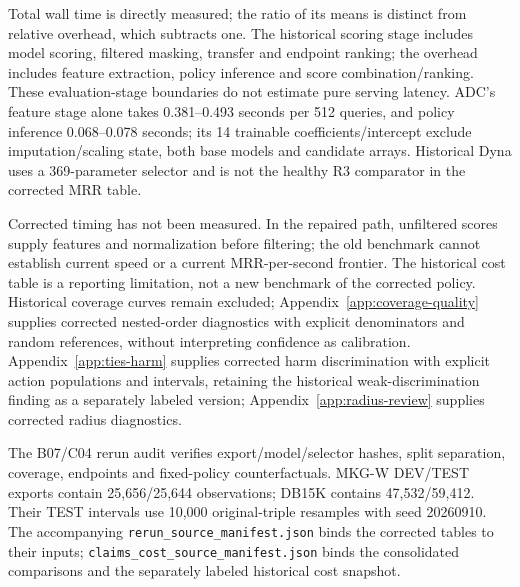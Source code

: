 \documentclass[11pt,a4paper]{article}
\begin{document}
Total wall time is directly measured; the ratio of its means is distinct from relative overhead, which subtracts one. The historical scoring stage includes model scoring, filtered masking, transfer and endpoint ranking; the overhead includes feature extraction, policy inference and score combination/ranking. These evaluation-stage boundaries do not estimate pure serving latency. ADC's feature stage alone takes 0.381--0.493 seconds per 512 queries, and policy inference 0.068--0.078 seconds; its 14 trainable coefficients/intercept exclude imputation/scaling state, both base models and candidate arrays. Historical Dyna uses a 369-parameter selector and is not the healthy R3 comparator in the corrected MRR table.

Corrected timing has not been measured. In the repaired path, unfiltered scores supply features and normalization before filtering; the old benchmark cannot establish current speed or a current MRR-per-second frontier. The historical cost table is a reporting limitation, not a new benchmark of the corrected policy. Historical coverage curves remain excluded; Appendix~\ref{app:coverage-quality} supplies corrected nested-order diagnostics with explicit denominators and random references, without interpreting confidence as calibration. Appendix~\ref{app:ties-harm} supplies corrected harm discrimination with explicit action populations and intervals, retaining the historical weak-discrimination finding as a separately labeled version; Appendix~\ref{app:radius-review} supplies corrected radius diagnostics.

The B07/C04 rerun audit verifies export/model/selector hashes, split separation, coverage, endpoints and fixed-policy counterfactuals. MKG-W DEV/TEST exports contain 25,656/25,644 observations; DB15K contains 47,532/59,412. Their TEST intervals use 10,000 original-triple resamples with seed 20260910. The accompanying \texttt{rerun\_source\_manifest.json} binds the corrected tables to their inputs; \texttt{claims\_cost\_source\_manifest.json} binds the consolidated comparisons and the separately labeled historical cost snapshot.

\FloatBarrier
\end{document}
